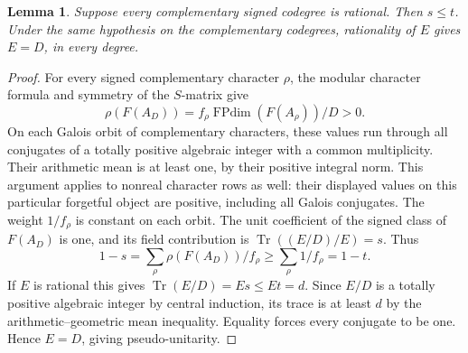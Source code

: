 \documentclass[11pt,a4paper]{article}
\newtheorem{lemma}[theorem]{Lemma}
\numberwithin{equation}{section}
\begin{document}
\begin{lemma}\label{lem:rational-E-descent}
Suppose every complementary signed codegree is rational. Then $s\le t$.
Under the same hypothesis on the complementary codegrees, rationality of $E$ gives $E=D$, in every degree.
\end{lemma}
\begin{proof}
For every signed complementary character $\rho$, the modular character
formula and symmetry of the $S$-matrix give
\[
 \rho(F(A_D))=f_\rho\operatorname{FPdim}(F(A_\rho))/D>0 .
\]
On each Galois orbit of complementary characters, these values run through
all conjugates of a totally positive algebraic integer with a common
multiplicity. Their arithmetic mean is at least one, by their positive
integral norm. This argument applies to nonreal character rows as well:
their displayed values on this particular forgetful object are positive,
including all Galois conjugates. The weight $1/f_\rho$ is constant on
each orbit. The unit coefficient of the signed class of $F(A_D)$ is one,
and its field contribution is
$\operatorname{Tr}((E/D)/E)=s$. Thus
\[
 1-s=\sum_{\rho}\rho(F(A_D))/f_\rho
       \ge\sum_{\rho}1/f_\rho=1-t .
\]
If $E$ is rational this gives $\operatorname{Tr}(E/D)=Es\le Et=d$.
Since $E/D$ is a totally positive algebraic integer by central induction,
its trace is at least $d$ by the arithmetic--geometric mean inequality.
Equality forces every conjugate to be one. Hence $E=D$, giving pseudo-unitarity.
\end{proof}
\end{document}
